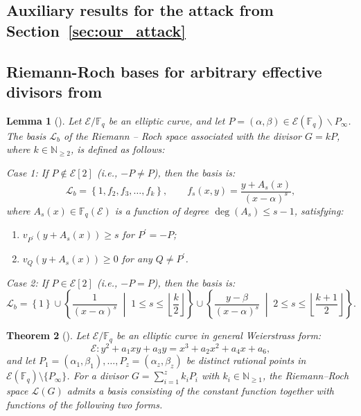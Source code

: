 \documentclass[sn-mathphys-num]{sn-jnl_modified}
\newcommand{\NN}{\ensuremath{\mathbb{N}}}
\newcommand{\FF}{\ensuremath{\mathbb{F}}}
\newtheorem{theorem}{Theorem}[subsection]
\newtheorem{lemma}[theorem]{Lemma}
\begin{document}
\begin{appendices}

\section{Auxiliary results for the attack from Section~\ref{sec:our_attack}}\label{sec:appendix_1}
\subsection{Riemann-Roch bases for arbitrary effective divisors from \cite{KM26}}

\begin{lemma}[{\cite[Lemma 3.1.1]{KM26}}]\label{lem:R-R_single}
Let $\mathcal{E}/\FF_{q}$ be an elliptic curve, and let $P = (\alpha, \beta) \in \mathcal{E}(\FF_{q})\backslash P_\infty$. The basis $\mathscr{L}_b$ of the Riemann – Roch space associated with the divisor $G = kP$, where $k \in \NN_{\geq 2}$, is defined as follows: 

Case 1: If $P \not\in \mathcal{E}[2]$ (i.e., $-P \neq P$), then the basis is:
\[
\mathscr{L}_b = \left\{ 1, f_2, f_3, \dots, f_k \right\}, \qquad 
f_s(x,y) = \frac{y + A_s(x)}{(x - \alpha)^s},
\]
where $A_s(x) \in \FF_{q}(\mathcal{E})$ is a function of degree $\deg(A_s) \leq s-1$, satisfying:
\begin{enumerate}
    \item $v_{P^\prime}(y + A_s(x)) \geq s$ for $P^\prime = -P$;
    \item $v_Q(y + A_s(x)) \geq 0$ for any $Q \neq P^\prime$.
\end{enumerate}

Case 2: If $P \in \mathcal{E}[2]$ (i.e., $-P = P$), then the basis is:
\[
\mathscr{L}_b = \left\{ 1 \right\} \cup \left\{ \frac{1}{(x-\alpha)^s} \;\middle|\; 1 \leq s \leq \left\lfloor \frac{k}{2} \right\rfloor \right\} \cup \left\{ \frac{y-\beta}{(x-\alpha)^s} \;\middle|\; 2 \leq s \leq \left\lfloor \frac{k+1}{2} \right\rfloor \right\}.
\]
\end{lemma}

\begin{theorem}[{\cite[Theorem 3.1.2]{KM26}}]\label{th:R-R_Arbitrary}
Let $\mathcal{E}/\mathbb{F}_{q}$ be an elliptic curve in general Weierstrass form:
\[
\mathcal{E}: y^2 + a_1xy + a_3y = x^3 + a_2x^2 + a_4x + a_6,
\]
and let $P_1 = (\alpha_1, \beta_1), \dots, P_z = (\alpha_z, \beta_z)$ be distinct rational points in $\mathcal{E}(\mathbb{F}_{q}) \setminus \{P_\infty\}$. For a divisor $G = \sum_{i=1}^z k_i P_i$ with $k_i \in \mathbb{N}_{\geq 1}$, the Riemann--Roch space $\mathscr{L}(G)$ admits a basis consisting of the constant function together with functions of the following two forms.


\end{theorem}
\end{appendices}
\end{document}
